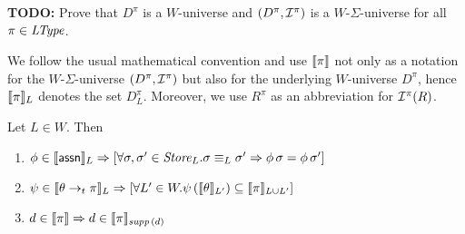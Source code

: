 \documentclass[12pt,a4paper]{report}
\begin{document}
{\bf TODO:} Prove that $D^\pi$ is a $W$-universe and $(D^\pi,\mathcal{I}^\pi)$ is a $W$-$\Sigma$-universe
for all $\pi\in\mathit{LType}$.

We follow the usual mathematical convention and use $\llbracket\pi\rrbracket$ not only as a notation
for the $W$-$\Sigma$-universe $(D^\pi,\mathcal{I}^\pi)$ but also for the underlying $W$-universe $D^\pi$,
hence $\llbracket\pi\rrbracket_L$ denotes the set $D^\pi_L$. Moreover, we use $R^\pi$ as an abbreviation
for $\mathcal{I}^\pi(R)$.

\begin{lemma}
  Let $L\in W$. Then
  \begin{enumerate}
    \item $\phi\in\llbracket\mathsf{assn}\rrbracket_L \Rightarrow \left[ \forall \sigma,\sigma'\in\mathit{Store}_L.
              \sigma \equiv_L \sigma' \Rightarrow \phi\,\sigma = \phi\,\sigma'\right]$
    \item $\psi\in\llbracket\theta\rightarrow_t\pi\rrbracket_L \Rightarrow
              \left[\forall L'\in W. \psi\,(\llbracket\theta\rrbracket_{L'})\subseteq\llbracket\pi\rrbracket_{L \cup L'} \right]$
    \item $d \in \llbracket\pi\rrbracket \Rightarrow d \in \llbracket\pi\rrbracket_{\mathit{supp}\,(d)}$
  \end{enumerate}
\end{lemma}
\end{document}
